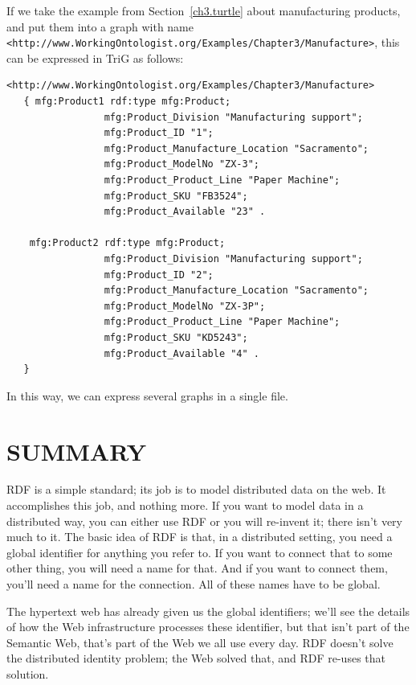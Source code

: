 If we take the 
example from Section~\ref{ch3.turtle} about manufacturing products, and put them into a graph with name \texttt{<http://www.WorkingOntologist.org/Examples/Chapter3/Manufacture>}, this can be expressed in TriG as follows: 


\begin{lstlisting}
<http://www.WorkingOntologist.org/Examples/Chapter3/Manufacture> 
   { mfg:Product1 rdf:type mfg:Product;
                 mfg:Product_Division "Manufacturing support"; 
                 mfg:Product_ID "1";
                 mfg:Product_Manufacture_Location "Sacramento";
                 mfg:Product_ModelNo "ZX-3"; 
                 mfg:Product_Product_Line "Paper Machine"; 
                 mfg:Product_SKU "FB3524";
                 mfg:Product_Available "23" .
    
    mfg:Product2 rdf:type mfg:Product; 
                 mfg:Product_Division "Manufacturing support"; 
                 mfg:Product_ID "2"; 
                 mfg:Product_Manufacture_Location "Sacramento"; 
                 mfg:Product_ModelNo "ZX-3P"; 
                 mfg:Product_Product_Line "Paper Machine"; 
                 mfg:Product_SKU "KD5243";
                 mfg:Product_Available "4" .
   }
\end{lstlisting}

In this way, we can express several graphs in a single file. 




\section{SUMMARY}


RDF is a simple standard; its job is to model distributed data on the web.
It accomplishes this job, and nothing more.  If you want to model data in a
distributed way,  you can either use RDF or you will re-invent it; there isn't very
much to it.  The basic idea of RDF is that, in a distributed setting, you need a global 
identifier for anything you refer to.  If you want to connect that to some other 
thing, you will need a name for that.  And if you want to connect them, you'll need a
name for the connection.  All of these names have to be global. 

The hypertext web has already given us the global identifiers; we'll see the details of how
the Web infrastructure processes these identifier, but that isn't part of the Semantic Web, that's
part of the Web we all use every day.  RDF doesn't solve the distributed identity problem; the Web solved that,
and RDF re-uses that solution. 


